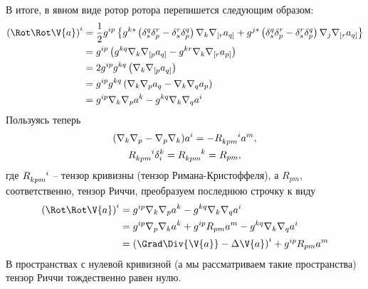     В итоге, в явном виде ротор ротора перепишется следующим образом:
    \begin{equation}\begin{aligned}
        \left( \Rot\Rot\V{a} \right)^i
            &= \frac{1}{2} g^{ip} \left\{
                    g^{ks} \left(
                        \delta_s^q \delta_p^r - \delta_s^r \delta_p^q
                    \right) \nabla_k \nabla_{[r} a_{q]} +
                    g^{js} \left(
                        \delta_s^q \delta_p^r - \delta_s^r \delta_p^q
                    \right) \nabla_j \nabla_{[r} a_{q]}
                \right\} \\
            &= g^{ip} \left(
                    g^{kq} \nabla_k \nabla_{[p} a_{q]} - g^{kr} \nabla_k \nabla_{[r} a_{p]}
                \right) \\
            &= 2 g^{ip} g^{kq} \left(
                    \nabla_k \nabla_{[p} a_{q]}
                \right) \\
            &= g^{ip} g^{kq} \left(
                    \nabla_k \nabla_{p} a_{q} - \nabla_k \nabla_{q} a_{p}
                \right) \\
            &= g^{ip} \nabla_k \nabla_{p} a^k - g^{kq} \nabla_k \nabla_{q} a^i
    \end{aligned}\end{equation}
    Пользуясь теперь
    \begin{equation}\begin{gathered}
        (\nabla_k \nabla_p - \nabla_p \nabla_k) a^i = - R_{kpm}^{\hphantom{kpm}i} a^m , \\
        R_{kpm}^{\hphantom{kpm}i} \delta_i^k = R_{kpm}^{\hphantom{kpm}k} = R_{pm} ,
    \end{gathered}\end{equation}
    где $R_{kpm}^{\hphantom{kpm}i}$ -- тензор кривизны (тензор Римана-Кристоффеля), а $R_{pm}$, соответственно, тензор Риччи, преобразуем последнюю строчку к виду
    \begin{equation}\begin{aligned}
        \left( \Rot\Rot\V{a} \right)^i
            &= g^{ip} \nabla_k \nabla_p a^k - g^{kq} \nabla_k \nabla_q a^i \\
            &= g^{ip} \nabla_p \nabla_k a^k
                + g^{ip} R_{pm} a^m
                - g^{kq} \nabla_k \nabla_q a^i \\
            &= \left( \Grad\Div{\V{a}} - \Delta{\V{a}} \right)^i + g^{ip} R_{pm} a^m
    \end{aligned}\end{equation}
    В пространствах с нулевой кривизной (а мы рассматриваем такие пространства) тензор Риччи тождественно равен нулю.

